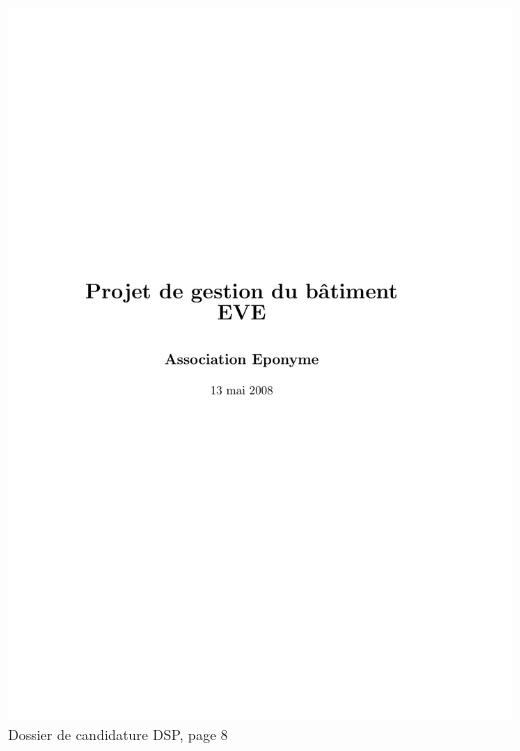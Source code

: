 \includegraphics[scale=0.85,trim=20mm 20mm 20mm 20mm,clip,page=8]{annexes/candidature_dsp.pdf} \\
Dossier de candidature DSP, page 8
\newpage
